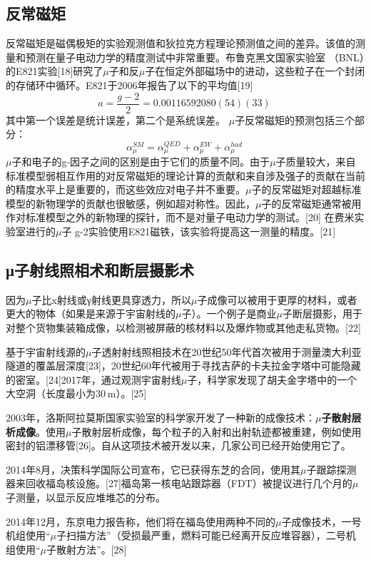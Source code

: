\subsection{反常磁矩}
反常磁矩是磁偶极矩的实验观测值和狄拉克方程理论预测值之间的差异。该值的测量和预测在量子电动力学的精度测试中非常重要。布鲁克黑文国家实验室 （BNL）的E821实验[18]研究了$\mu$子和反$\mu$子在恒定外部磁场中的进动，这些粒子在一个封闭的存储环中循环。E821于2006年报告了以下的平均值[19]\begin{equation}
a=\frac{g-2}{2}=0.00116592080(54)(33)~
\end{equation}
其中第一个误差是统计误差，第二个是系统误差。
$\mu$子反常磁矩的预测包括三个部分：
\begin{equation}
\alpha_\mu^{SM}=\alpha_\mu^{QED}+\alpha^{EW}_\mu+\alpha_\mu^{had}~
\end{equation}
$\mu$子和电子的g-因子之间的区别是由于它们的质量不同。由于$\mu$子质量较大，来自标准模型弱相互作用的对反常磁矩的理论计算的贡献和来自涉及强子的贡献在当前的精度水平上是重要的，而这些效应对电子并不重要。$\mu$子的反常磁矩对超越标准模型的新物理学的贡献也很敏感，例如超对称性。因此，$\mu$子的反常磁矩通常被用作对标准模型之外的新物理的探针，而不是对量子电动力学的测试。[20] 在费米实验室进行的$\mu$子 g-2实验使用E821磁铁，该实验将提高这一测量的精度。[21]
\subsection{μ子射线照相术和断层摄影术}
因为$\mu$子比x射线或γ射线更具穿透力，所以$\mu$子成像可以被用于更厚的材料，或者更大的物体（如果是来源于宇宙射线的$\mu$子）。一个例子是商业$\mu$子断层摄影，用于对整个货物集装箱成像，以检测被屏蔽的核材料以及爆炸物或其他走私货物。[22]

基于宇宙射线源的$\mu$子透射射线照相技术在20世纪50年代首次被用于测量澳大利亚隧道的覆盖层深度[23]，20世纪60年代被用于寻找吉萨的卡夫拉金字塔中可能隐藏的密室。[24]2017年，通过观测宇宙射线$\mu$子，科学家发现了胡夫金字塔中的一个大空洞（长度最小为30 m）。[25]

2003年，洛斯阿拉莫斯国家实验室的科学家开发了一种新的成像技术：\textbf{$\mu$子散射层析成像}。使用$\mu$子散射层析成像，每个粒子的入射和出射轨迹都被重建，例如使用密封的铝漂移管[26]。自从这项技术被开发以来，几家公司已经开始使用它了。

2014年8月，决策科学国际公司宣布，它已获得东芝的合同，使用其$\mu$子跟踪探测器来回收福岛核设施。[27]福岛第一核电站跟踪器（FDT）被提议进行几个月的$\mu$子测量，以显示反应堆堆芯的分布。

2014年12月，东京电力报告称，他们将在福岛使用两种不同的$\mu$子成像技术，一号机组使用“$\mu$子扫描方法”（受损最严重，燃料可能已经离开反应堆容器），二号机组使用“$\mu$子散射方法”。[28]

